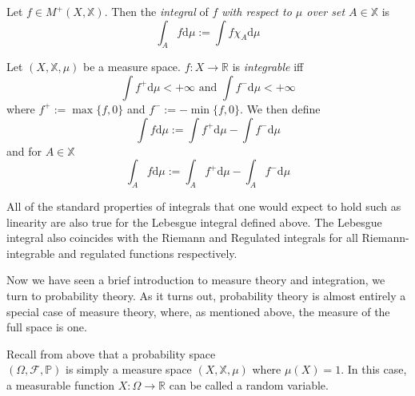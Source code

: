 \begin{definition}
    Let $f\in M^+(X,\mathbb{X})$. Then the \emph{integral} of $f$
    \emph{with respect to $\mu$ over set $A\in \mathbb{X}$} is
    \begin{equation}
        \int_A f\mathrm d\mu:=\int f\chi_A\mathrm d\mu
    \end{equation}
\end{definition}

\begin{definition}
    Let $(X,\mathbb{X},\mu)$ be a measure space. $f:X\rightarrow\mathbb{R}$
    is \emph{integrable} iff 
    \begin{equation}
        \int f^+\mathrm d\mu<+\infty \textrm{ and }\int f^-\mathrm d\mu<+\infty
    \end{equation}
    where $f^+:=\max\{f,0\}$ and $f^-:=-\min\{f,0\}$.
    We then define
    \begin{equation}
        \int f\mathrm d\mu:=\int f^+\mathrm d\mu -\int f^-\mathrm d\mu
    \end{equation}
    and for $A\in\mathbb{X}$
    \begin{equation}
        \int_A f\mathrm d\mu:=\int_A f^+\mathrm d\mu -\int_A f^-\mathrm d\mu
    \end{equation}
\end{definition}

\begin{remark}
    All of the standard properties of integrals that one would expect
    to hold such as linearity are also true for the Lebesgue integral 
    defined above. The Lebesgue integral also coincides with the Riemann
    and Regulated integrals for all Riemann-integrable and regulated functions respectively.
\end{remark}

Now we have seen a brief introduction to measure theory and integration, we turn to 
probability theory. As it turns out, probability theory is almost entirely a special
case of measure theory, where, as mentioned above, the measure of the full space is one.

\begin{definition}
    Recall from above that a probability space \\$(\Omega,\mathcal{F},\mathbb{P})$
    is simply a measure space $(X,\mathbb{X},\mu)$ where $\mu(X)=1.$ In this case,
    a measurable function $X:\Omega\rightarrow\mathbb{R}$ can be called
    a random variable. 
\end{definition}

